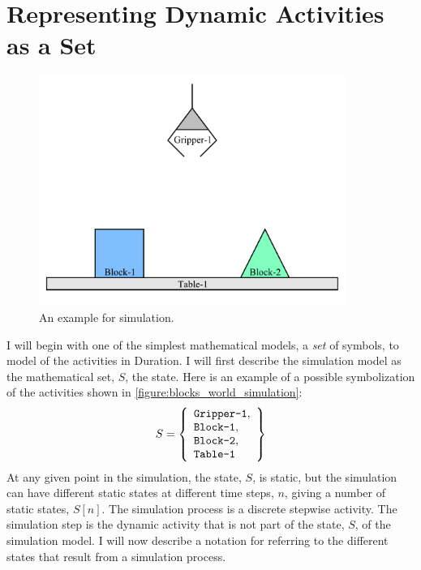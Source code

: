 \section{Representing Dynamic Activities as a Set}

\begin{figure}
\includegraphics[width=10cm]{gfx/blocks_world_simulation}
\caption{An example for simulation.}
\label{figure:blocks_world_simulation}
\end{figure}

I will begin with one of the simplest mathematical models, a
\emph{set} of symbols, to model of the activities in Duration.  I will
first describe the simulation model as the mathematical set, $S$, the
state.  Here is an example of a possible symbolization of the
activities shown in {\mbox{\autoref{figure:blocks_world_simulation}}}:
\begin{equation}
\label{equation:example_initial_state}
S =
  \left\{
    \begin{array}{l}
      \text{{\tt{Gripper-1}}}, \\
      \text{{\tt{Block-1}}}, \\
      \text{{\tt{Block-2}}}, \\
      \text{{\tt{Table-1}}}
    \end{array}
  \right\}
\end{equation}
At any given point in the simulation, the state, $S$, is static, but
the simulation can have different static states at different time
steps, $n$, giving a number of static states, $S[n]$.  The simulation
process is a discrete stepwise activity.  The simulation step is the
dynamic activity that is not part of the state, $S$, of the simulation
model.  I will now describe a notation for referring to the different
states that result from a simulation process.

